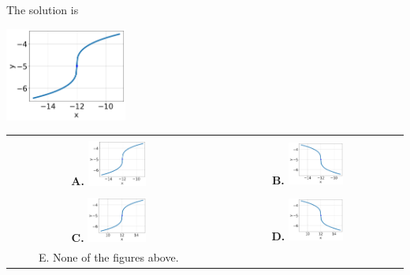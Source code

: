 \documentclass{extbook}[14pt]
\begin{document}
 
 The solution is  
 \begin{center} \includegraphics[width=0.3\textwidth]{../Figures/radicalEquationToGraphBC.png} \end{center}\begin{tabular}{|c|c|} 
\hline 
 & \tabularnewline 
 \textbf{A.} \includegraphics[width=0.3\textwidth]{../Figures/radicalEquationToGraphBC.png} & \textbf{B.} \includegraphics[width=0.3\textwidth]{../Figures/radicalEquationToGraphAC.png} \tabularnewline 
\hline 
 & \tabularnewline 
 \textbf{C.} \includegraphics[width=0.3\textwidth]{../Figures/radicalEquationToGraphDC.png} & \textbf{D.} \includegraphics[width=0.3\textwidth]{../Figures/radicalEquationToGraphCC.png} \tabularnewline 
\hline 
 E. None of the figures above. & \tabularnewline 
\hline 
 \end{tabular} 
 
\end{document}
